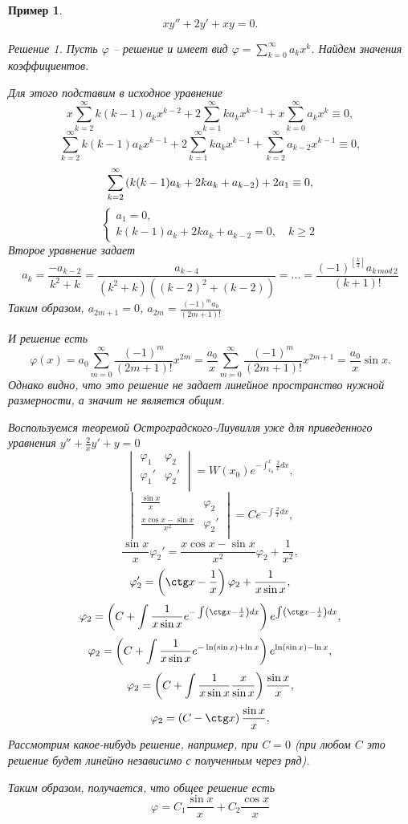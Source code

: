 \documentclass[a5paper, 11pt]{article}
\theoremstyle{definition}
\theoremstyle{plain}
\newtheorem{Ex}{Пример}
\theoremstyle{remark}
\newtheorem*{Solution}{Решение}
\begin{document}
	\begin{Ex}
		\[
		xy''+2y'+xy=0.
		\]
		\begin{Solution}
			Пусть $\varphi$ -- решение и имеет вид $\varphi = \sum\limits_{k=0}^{\infty} a_k x^k$. Найдем значения коэффициентов.
			
			Для этого подставим в исходное уравнение
			\[
			x\sum\limits_{k=2}^{\infty} k(k-1) a_k x^{k-2} + 2\sum\limits_{k=1}^{\infty}k  a_k x^{k-1} + x \sum\limits_{k=0}^{\infty} a_k x^k \equiv 0,
			\]
			\[
			\sum\limits_{k=2}^{\infty} k(k-1) a_k x^{k-1} + 2\sum\limits_{k=1}^{\infty}k  a_k x^{k-1}  +  \sum\limits_{k=2}^{\infty} a_{k-2} x^{k-1} \equiv 0,
			\]
			\[
			\sum\limits_{k=2}^{\infty} \left(k(k-1) a_k + 2ka_k + a_{k-2}\right) + 2a_1 \equiv 0,
			\]
			\[
			\begin{cases}
				a_1 = 0,\\
				k(k-1) a_k + 2ka_k + a_{k-2} = 0, \quad k \geqslant 2
			\end{cases}
			\]
			Второе уравнение задает
			\[
			a_k = \frac{-a_{k-2}}{k^2+k}= \frac{a_{k-4}}{(k^2+k)((k-2)^2 + (k-2))} = \dots = \frac{(-1)^{[\frac{k}{2}]} a_{k\,mod\,2}}{(k+1)!}
			\]
			Таким образом, $a_{2m+1} = 0$, $a_{2m} = \frac{(-1)^{m} a_{0}}{(2m+1)!}$
			
			И решение есть
			\[
			\varphi(x) = a_0 \sum\limits_{m=0}^{\infty} \frac{(-1)^{m}}{(2m+1)!} x^{2m} = \frac{a_0}{x} \sum\limits_{m=0}^{\infty} \frac{(-1)^{m}}{(2m+1)!} x^{2m+1} = \frac{a_0}{x} \sin x.
			\]
			Однако видно, что это решение не задает линейное пространство нужной размерности, а значит не является общим.
			
			Воспользуемся теоремой Остроградского-Лиувилля уже для приведенного уравнения $y'' + \frac{2}{x} y' + y = 0$
			\[
			\begin{vmatrix}
				\varphi_1 & \varphi_2 \\
				\varphi_1' & \varphi_2' \\
			\end{vmatrix} = W(x_0) e^{-\int_{x_0}^x \frac{2}{x}dx},
			\]
			\[
			\begin{vmatrix}
				\frac{\sin x}{x} & \varphi_2 \\
				\frac{x\cos x - \sin x}{x^2} & \varphi_2' \\
			\end{vmatrix} = C e^{-\int \frac{2}{x}dx},
			\]
			\[
			\frac{\sin x}{x} \varphi_2' = \frac{x\cos x - \sin x}{x^2} \varphi_2 + \frac{1}{x^2},
			\]
			\[
			\varphi_2' = \hr{\ctg x - \frac1x} \varphi_2 + \frac{1}{x\sin x},
			\]
			\[
			\varphi_2 = \hr{C + \int \frac1{x\sin x} e^{-\int \hr{\ctg x - \frac1x}dx}} e^{\int \hr{\ctg x - \frac1x}dx},
			\]
			\[
			\varphi_2 = \left(C + \int \frac1{x\sin x} e^{-\ln(\sin x) + \ln x}\right) e^{\ln(\sin x) - \ln x},
			\]
			\[
			\varphi_2 = \left(C + \int \frac1{x\sin x} \frac{x}{\sin x}\right) \frac{\sin x}{x},
			\]
			\[
			\varphi_2 = \hr{C - \ctg x} \frac{\sin x}{x},
			\]
			Рассмотрим какое-нибудь решение, например, при $C=0$ (при любом $C$ это решение будет линейно независимо с полученным через ряд).
			
			Таким образом, получается, что общее решение есть 
			\[
			\varphi = C_1 \frac{\sin x}{x} + C_2 \frac{\cos x}{x}
			\]
		\end{Solution}
	\end{Ex}
\end{document}
